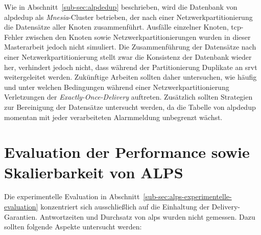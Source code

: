 Wie in Abschnitt~\ref{sub-sec:alpdedup} beschrieben, wird die Datenbank von \gls{alpdedup} als \textit{Mnesia}-Cluster betrieben, der nach einer Netzwerkpartitionierung die Datensätze aller Knoten zusammenführt. Ausfälle einzelner Knoten, \gls{tcp}-Fehler zwischen den Knoten sowie Netzwerkpartitionierungen wurden in dieser Masterarbeit jedoch nicht simuliert. Die Zusammenführung der Datensätze nach einer Netzwerkpartitionierung stellt zwar die Konsistenz der Datenbank wieder her, verhindert jedoch nicht, dass während der Partitionierung Duplikate an \gls{srvt} weitergeleitet werden. Zukünftige Arbeiten sollten daher untersuchen, wie häu\-fig und unter welchen Bedingungen während einer Netzwerkpartitionierung Verletzungen der \textit{Exactly-Once-Delivery} auftreten. Zusätzlich sollten Strategien zur Bereinigung der Daten\-sätze untersucht werden, da die Tabelle von \gls{alpdedup} momentan mit jeder verarbeiteten Alarmmeldung unbegrenzt wächst.

\section{Evaluation der Performance sowie Skalierbarkeit von ALPS}
\label{sec:ausblick-performance}

Die experimentelle Evaluation in Abschnitt~\ref{sub-sec:alps-experimentelle-evaluation} konzentriert sich ausschließlich auf die Einhaltung der Delivery-Garantien. Antwortzeiten und Durchsatz von \gls{alps} wurden nicht gemessen. Dazu sollten folgende Aspekte untersucht werden:

